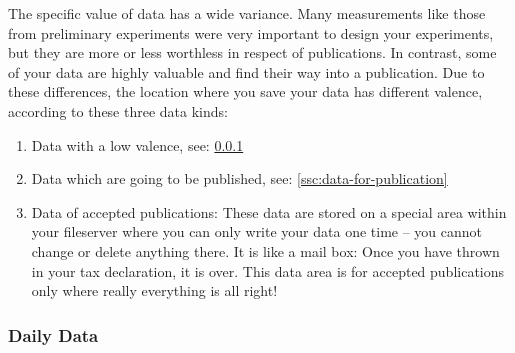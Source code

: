 The specific value of data has a wide variance. Many measurements like those
from preliminary experiments were very important to design your experiments,
but they are more or less worthless in respect of publications. In contrast,
some of your data are highly valuable and find their way into a publication.
Due to these differences, the location where you save your data has different
valence, according to these three data kinds:
\begin{enumerate}[label=\Roman*.]
  \item Data with a low valence, see:
       \ref{ssc:daily-data} 
  \item Data which are going to be published, see:
        \ref{ssc:data-for-publication} 
  \item Data of accepted publications: These data are stored on a special area
        within your fileserver where you can only write your data one time – you
        cannot change or delete anything there. It is like a mail box: Once you
        have thrown in your tax declaration, it is over. This data area is for
        accepted publications only where really everything is all right!
\end{enumerate}

\subsubsection{Daily Data}\label{ssc:daily-data}

